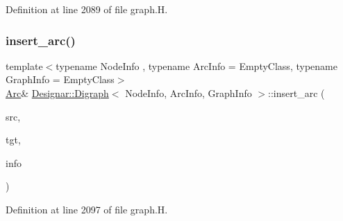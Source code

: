 Definition at line 2089 of file graph.\+H.

\mbox{\label{class_designar_1_1_digraph_a58d7f0e13a9e42cbc9e28683b527ca72}} 
\subsubsection{\texorpdfstring{insert\+\_\+arc()}{insert\_arc()}\hspace{0.1cm}{\footnotesize\ttfamily [3/4]}}
{\footnotesize\ttfamily template$<$typename Node\+Info , typename Arc\+Info  = Empty\+Class, typename Graph\+Info  = Empty\+Class$>$ \\
\hyperlink{class_designar_1_1_digraph_a0ceb278671f2a535c00fddccdeafd69f}{Arc}\& \hyperlink{class_designar_1_1_digraph}{Designar\+::\+Digraph}$<$ Node\+Info, Arc\+Info, Graph\+Info $>$\+::insert\+\_\+arc (\begin{DoxyParamCaption}\item[{\hyperlink{class_designar_1_1_digraph_a4dc921c41a480b7946a04170e997d8ae}{Node} \&}]{src,  }\item[{\hyperlink{class_designar_1_1_digraph_a4dc921c41a480b7946a04170e997d8ae}{Node} \&}]{tgt,  }\item[{const Arc\+Info \&}]{info }\end{DoxyParamCaption})\hspace{0.3cm}{\ttfamily [inline]}}



Definition at line 2097 of file graph.\+H.

\mbox{\label{class_designar_1_1_digraph_a9e46012a65696859c131d0bc5e096f55}} 
